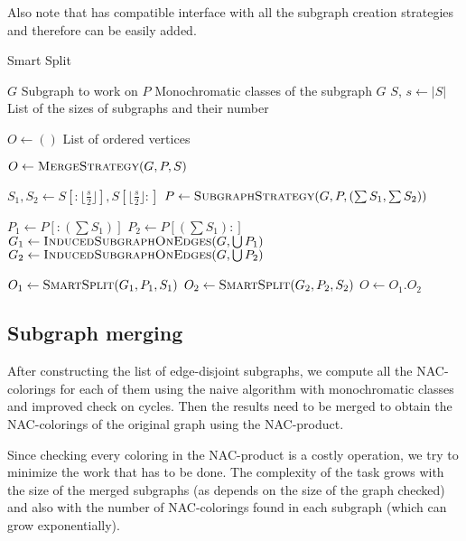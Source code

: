 Also note that  has compatible interface with
all the subgraph creation strategies and therefore can be easily added.

\begin{algorithm}
	\caption{Smart Split}%
	\label{alg:smart_split}
	\begin{algorithmic}[1]
		\Require{} $G$
		\Comment{} Subgraph to work on
		\Require{} $P$
		\Comment{} Monochromatic classes of the subgraph $G$
		\Require{} $S$, $s \gets |S|$
		\Comment{} List of the sizes of subgraphs and their number

		\Ensure{} $O \gets ()$
		\Comment{} List of ordered vertices

		\State{} $O \gets \Call{MergeStrategy}{G, P, S}$
		\State{}
		\Return{}
		\EndIf{}

		\State{} $S_1, S_2 \gets S[:\lfloor\frac{s}{2}\rfloor], S[\lfloor\frac{s}{2}\rfloor:]$
		\State{} $P \gets \Call{SubgraphStrategy}{G, P, (\sum S_{1}, \sum S_{2})}$

		\State{} $P_1 \gets P[:(\sum S_1)]$
		\State{} $P_2 \gets P[(\sum S_1):]$
		\State{} $G_1 \gets \Call{InducedSubgraphOnEdges}{G, \bigcup P_1}$
		\State{} $G_2 \gets \Call{InducedSubgraphOnEdges}{G, \bigcup P_2}$

		\State{} $O_1 \gets \Call{SmartSplit}{G_1, P_1, S_1}$
		\State{} $O_2 \gets \Call{SmartSplit}{G_2, P_2, S_2}$
		\State{} $O \gets O_{1}.O_{2}$
	\end{algorithmic}
\end{algorithm}


\subsection{Subgraph merging}%
\label{sec:merging}

After constructing the list of edge-disjoint subgraphs,
we compute all the NAC-colorings for each of them using
the naive algorithm with monochromatic classes
and improved check on cycles.
Then the results need to be merged to obtain the NAC-colorings of the original graph
using the NAC-product.

Since checking every coloring in the NAC-product is a costly operation,
we try to minimize the work that has to be done.
The complexity of the task grows with the size of
the merged subgraphs (as \IsNACColoring{} depends on the size of the graph checked)
and also with the number of NAC-colorings found in each subgraph
(which can grow exponentially).

